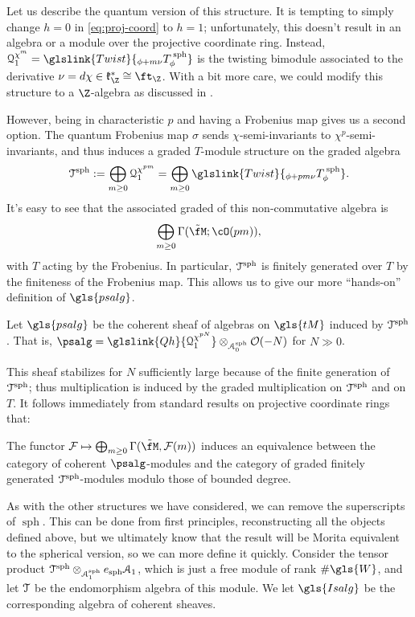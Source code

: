   Let us describe the quantum version of this structure.  It is tempting to simply change $h=0$ in \eqref{eq:proj-coord} to $h=1$; unfortunately, this doesn't result in an algebra
  or a module over the projective coordinate ring.  Instead, $\EuScript{Q}_1^{\chi^m}=\glslink{Twist}{{}_{\phi+m\nu}T^{\:\operatorname{sph}}_\phi}$ is the twisting bimodule associated to the derivative $\nu=d\chi\in \mathfrak{k}_\Z^*\cong \ft_\Z$.   With a bit more care, we could modify this structure to a $\Z$-algebra as discussed in \cite[\S 5.5]{BLPWquant}.

However, being in characteristic $p$ and having a Frobenius map gives us a second option.  The quantum Frobenius map $\sigma$ sends $\chi$-semi-invariants to $\chi^p$-semi-invariants, and thus induces a graded $T$-module structure on the graded algebra \[\EuScript{T}^{\operatorname{sph}}:=\bigoplus_{m\geq 0}\EuScript{Q}_1^{\chi^{pm}}=\bigoplus_{m\geq 0}\glslink{Twist}{{}_{\phi+pm\nu}T^{\:\operatorname{sph}}_\phi}.\]
It's easy to see that the associated graded of this non-commutative algebra is \[\bigoplus_{m\geq 0}\Gamma(\tilde{\fM};\cO(pm)),\] with $T$ acting by the Frobenius. In particular, $\EuScript{T}^{\operatorname{sph}}$ is finitely generated over $T$ by the finiteness of the Frobenius map.
This allows us to give our more ``hands-on'' definition of $\gls{psalg}$.
\begin{definition}
 Let $\gls{psalg}$ be the coherent sheaf of algebras on $\gls{tM}$ induced by $\EuScript{T}^{\operatorname{sph}}$.  That is, $\psalg=\glslink{Qh}{\EuScript{Q}_1^{\chi^{pN}}}\otimes_{\EuScript{A}_0^{\operatorname{sph}}}\mathcal{O}(-N)$ for $N\gg 0$.  
\end{definition}
This sheaf stabilizes for $N$ sufficiently large because of the finite generation of $\EuScript{T}^{\operatorname{sph}}$; thus multiplication is induced by the graded multiplication on $\EuScript{T}^{\operatorname{sph}}$ and on $T$.   It follows immediately from standard results on projective coordinate rings that:
\begin{corollary}
  The functor $\mathcal{F}\mapsto \bigoplus_{m\geq 0}\Gamma(\tilde{\fM},\mathcal{F}(m))$ induces an equivalence between the category of coherent $\psalg$-modules and the category of graded finitely generated $\EuScript{T}^{\operatorname{sph}}$-modules modulo those of bounded degree.
\end{corollary}
As with the other structures we have considered, we can remove the superscripts of $\operatorname{sph}$.  This can be done from first principles, reconstructing all the objects defined above, but we ultimately know that the result will be Morita equivalent to the spherical version, so we can more define it quickly.  Consider the tensor product $\EuScript{T}^{\operatorname{sph}}\otimes_{\EuScript{A}_1^{\operatorname{sph}}}e_{\operatorname{sph}}\EuScript{A}_1$, which is just a free module of rank $\#\gls{W}$, and let $\EuScript{T}$ be the endomorphism algebra of this module.  We let $\gls{Isalg}$ be the corresponding algebra of coherent sheaves.  



